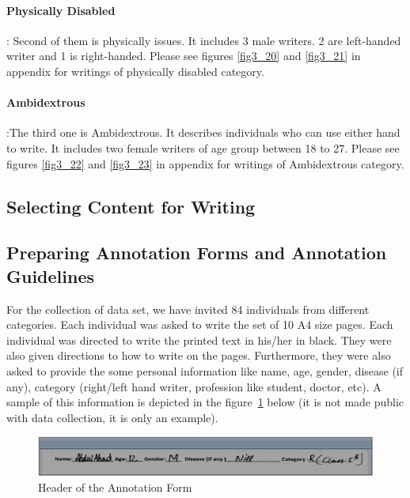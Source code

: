 \documentclass[a4paper,conference]{IEEEtran}
\begin{document}

\paragraph{Physically Disabled}: Second of them is physically issues. It includes 3 male writers.  2 are left-handed writer and 1 is right-handed. Please see figures \ref{fig3_20} and \ref{fig3_21} in appendix for writings of physically disabled category.




\paragraph{Ambidextrous}:The third one is Ambidextrous. It describes individuals who can use either hand to write. It includes two female writers of age group between 18 to 27. Please see figures \ref{fig3_22} and \ref{fig3_23} in appendix for writings of Ambidextrous category.




\subsection{Selecting Content for Writing }

\subsection{Preparing Annotation Forms and Annotation Guidelines }
For the collection of data set, we have invited 84 individuals from different categories. Each individual was asked to write the set of 10 A4 size pages. Each individual was directed to write the printed text in his/her in black. They were also given directions to how to write on the pages. Furthermore, they were also asked to provide the some personal information like name, age, gender, disease (if any), category (right/left hand writer, profession like student, doctor, etc). A sample of this information is depicted in the figure~\ref{fig3_1} below (it is not made public with data collection, it is only an example).

\begin{figure}[t]
\centering
	\includegraphics[width=8.cm]{figures/Fig3_1.png}
\caption{Header of the Annotation Form}\label{fig3_1}
\end{figure}
\end{document}

